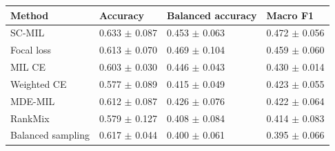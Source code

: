 \begin{tabular}{llll}
\toprule
Method & Accuracy & Balanced accuracy & Macro F1\\
\midrule
SC-MIL & \num{0.633} $\pm$ \num{0.087} & \num{0.453} $\pm$ \num{0.063} & \num{0.472} $\pm$ \num{0.056}\\
Focal loss & \num{0.613} $\pm$ \num{0.070} & \num{0.469} $\pm$ \num{0.104} & \num{0.459} $\pm$ \num{0.060}\\
MIL CE & \num{0.603} $\pm$ \num{0.030} & \num{0.446} $\pm$ \num{0.043} & \num{0.430} $\pm$ \num{0.014}\\
Weighted CE & \num{0.577} $\pm$ \num{0.089} & \num{0.415} $\pm$ \num{0.049} & \num{0.423} $\pm$ \num{0.055}\\
MDE-MIL & \num{0.612} $\pm$ \num{0.087} & \num{0.426} $\pm$ \num{0.076} & \num{0.422} $\pm$ \num{0.064}\\
RankMix & \num{0.579} $\pm$ \num{0.127} & \num{0.408} $\pm$ \num{0.084} & \num{0.414} $\pm$ \num{0.083}\\
Balanced sampling & \num{0.617} $\pm$ \num{0.044} & \num{0.400} $\pm$ \num{0.061} & \num{0.395} $\pm$ \num{0.066}\\
\bottomrule
\end{tabular}
